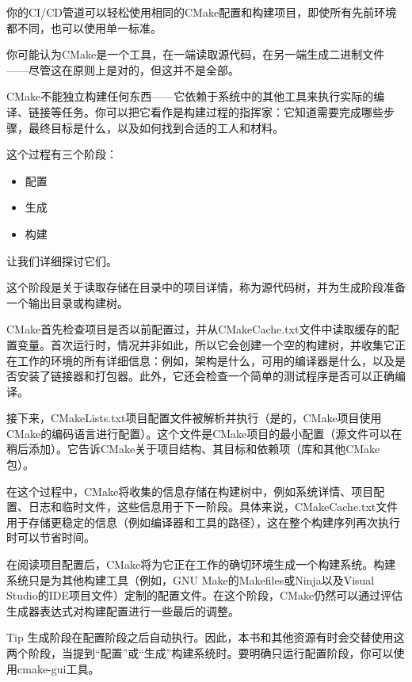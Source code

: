 你的CI/CD管道可以轻松使用相同的CMake配置和构建项目，即使所有先前环境都不同，也可以使用单一标准。


你可能认为CMake是一个工具，在一端读取源代码，在另一端生成二进制文件——尽管这在原则上是对的，但这并不是全部。

CMake不能独立构建任何东西——它依赖于系统中的其他工具来执行实际的编译、链接等任务。你可以把它看作是构建过程的指挥家：它知道需要完成哪些步骤，最终目标是什么，以及如何找到合适的工人和材料。

这个过程有三个阶段：

\begin{itemize}
\item
配置

\item
生成

\item
构建
\end{itemize}

让我们详细探讨它们。


这个阶段是关于读取存储在目录中的项目详情，称为源代码树，并为生成阶段准备一个输出目录或构建树。

CMake首先检查项目是否以前配置过，并从CMakeCache.txt文件中读取缓存的配置变量。首次运行时，情况并非如此，所以它会创建一个空的构建树，并收集它正在工作的环境的所有详细信息：例如，架构是什么，可用的编译器是什么，以及是否安装了链接器和打包器。此外，它还会检查一个简单的测试程序是否可以正确编译。

接下来，CMakeLists.txt项目配置文件被解析并执行（是的，CMake项目使用CMake的编码语言进行配置）。这个文件是CMake项目的最小配置（源文件可以在稍后添加）。它告诉CMake关于项目结构、其目标和依赖项（库和其他CMake包）。

在这个过程中，CMake将收集的信息存储在构建树中，例如系统详情、项目配置、日志和临时文件，这些信息用于下一阶段。具体来说，CMakeCache.txt文件用于存储更稳定的信息（例如编译器和工具的路径），这在整个构建序列再次执行时可以节省时间。


在阅读项目配置后，CMake将为它正在工作的确切环境生成一个构建系统。构建系统只是为其他构建工具（例如，GNU Make的Makefiles或Ninja以及Visual Studio的IDE项目文件）定制的配置文件。在这个阶段，CMake仍然可以通过评估生成器表达式对构建配置进行一些最后的调整。

\begin{myTip}{Tip}
生成阶段在配置阶段之后自动执行。因此，本书和其他资源有时会交替使用这两个阶段，当提到“配置”或“生成”构建系统时。要明确只运行配置阶段，你可以使用cmake-gui工具。
\end{myTip}

